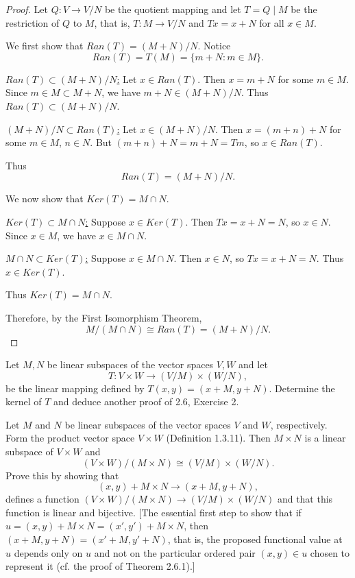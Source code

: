 \begin{proof}
    Let $Q : V \longrightarrow V / N$ be the quotient mapping and let $T = Q \mid M$
    be the restriction of $Q$ to $M$, that is, $T : M \longrightarrow V / N$
    and $Tx = x + N$ for all $x \in M$.

    We first show that $Ran(T) = (M + N) / N$. Notice
    \[
    Ran(T) = T(M) = \{m + N : m \in M\}.
    \]

    \underline{$Ran(T) \subset (M + N) / N$:} 
    Let $x \in Ran(T)$. Then $x = m + N$ for some $m \in M$.
    Since $m \in M \subset M + N$, we have $m + N \in (M + N)/N$.
    Thus $Ran(T) \subset (M + N)/N$.

    \underline{$(M + N) / N \subset Ran(T)$:} 
    Let $x \in (M + N)/N$. Then $x = (m + n) + N$ for some $m \in M$, $n \in N$.
    But $(m + n) + N = m + N = Tm$, so $x \in Ran(T)$.

    Thus 
    \[
    Ran(T) = (M + N) / N.
    \]

    We now show that $Ker(T) = M \cap N$.

    \underline{$Ker(T) \subset M \cap N$:} 
    Suppose $x \in Ker(T)$. Then $Tx = x + N = N$, so $x \in N$.
    Since $x \in M$, we have $x \in M \cap N$.

    \underline{$M \cap N \subset Ker(T)$:} 
    Suppose $x \in M \cap N$. Then $x \in N$, so $Tx = x + N = N$.
    Thus $x \in Ker(T)$.

    Thus $Ker(T) = M \cap N$.

    Therefore, by the First Isomorphism Theorem,
    \[
    M / (M \cap N) \cong Ran(T) = (M + N) / N.
    \]
\end{proof}

\begin{tcolorbox}[title=Problem 2, breakable]
    Let $M, N$ be linear subspaces of the vector spaces $V, W$ and let 
    \[T : V \times W \longrightarrow (V / M) \times (W / N),\]
    be the linear mapping defined by $T(x, y) = (x + M, y + N)$.
    Determine the kernel of $T$ and deduce another proof of 2.6, Exercise 2.
\end{tcolorbox}

\begin{tcolorbox}[title=2.6 Problem 2, breakable]
    Let $M$ and $N$ be linear subspaces of the vector spaces $V$ and $W$,
        respectively.
    Form the product vector space $V \times W$ (Definition 1.3.11).
    Then $M \times N$ is a linear subspace of $V \times W$ and 
    \[(V \times W) / (M \times N) \cong (V / M) \times (W / N).\]
    Prove this by showing that 
    \[(x, y) + M \times N \longrightarrow (x + M, y + N),\]
    defines a function $(V \times W) / (M \times N) \longrightarrow (V / M) \times (W / N)$
    and that this function is linear and bijective. 
    [The essential first step to show that if $u = (x, y) + M \times N = (x', y') + M \times N$,
    then $(x + M, y + N) = (x' + M, y' + N)$, that is, the proposed functional value at $u$ 
    depends only on $u$ and not on the particular ordered pair $(x, y) \in u$ chosen to 
    represent it (cf. the proof of Theorem 2.6.1).]
\end{tcolorbox}

